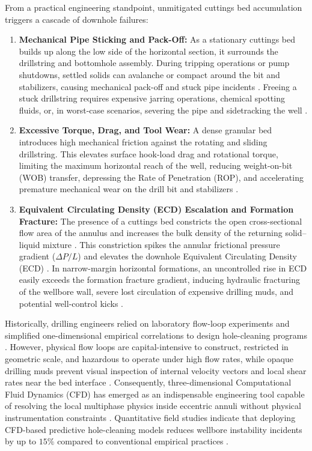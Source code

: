 From a practical engineering standpoint, unmitigated cuttings bed accumulation triggers a cascade of downhole failures:
\begin{enumerate}
    \item \textbf{Mechanical Pipe Sticking and Pack-Off:} As a stationary cuttings bed builds up along the low side of the horizontal section, it surrounds the drillstring and bottomhole assembly. During tripping operations or pump shutdowns, settled solids can avalanche or compact around the bit and stabilizers, causing mechanical pack-off and stuck pipe incidents \citep{Shehab2015, Li2026}. Freeing a stuck drillstring requires expensive jarring operations, chemical spotting fluids, or, in worst-case scenarios, severing the pipe and sidetracking the well \citep{Sorgun2010, Hajipour2020}.
    \item \textbf{Excessive Torque, Drag, and Tool Wear:} A dense granular bed introduces high mechanical friction against the rotating and sliding drillstring. This elevates surface hook-load drag and rotational torque, limiting the maximum horizontal reach of the well, reducing weight-on-bit (WOB) transfer, depressing the Rate of Penetration (ROP), and accelerating premature mechanical wear on the drill bit and stabilizers \citep{Shehab2015, Khaled2021}.
    \item \textbf{Equivalent Circulating Density (ECD) Escalation and Formation Fracture:} The presence of a cuttings bed constricts the open cross-sectional flow area of the annulus and increases the bulk density of the returning solid--liquid mixture \citep{Osgouei2010, Li2026}. This constriction spikes the annular frictional pressure gradient ($\Delta P/L$) and elevates the downhole Equivalent Circulating Density (ECD) \citep{Khalili2025, Li2026}. In narrow-margin horizontal formations, an uncontrolled rise in ECD easily exceeds the formation fracture gradient, inducing hydraulic fracturing of the wellbore wall, severe lost circulation of expensive drilling muds, and potential well-control kicks \citep{Khalili2025, Li2026}.
\end{enumerate}

Historically, drilling engineers relied on laboratory flow-loop experiments and simplified one-dimensional empirical correlations to design hole-cleaning programs \citep{Osgouei2010, Sorgun2010}. However, physical flow loops are capital-intensive to construct, restricted in geometric scale, and hazardous to operate under high flow rates, while opaque drilling muds prevent visual inspection of internal velocity vectors and local shear rates near the bed interface \citep{Hajipour2020, Li2026}. Consequently, three-dimensional Computational Fluid Dynamics (CFD) has emerged as an indispensable engineering tool capable of resolving the local multiphase physics inside eccentric annuli without physical instrumentation constraints \citep{Hajipour2020, Khalili2025}. Quantitative field studies indicate that deploying CFD-based predictive hole-cleaning models reduces wellbore instability incidents by up to $15\%$ compared to conventional empirical practices \citep{Khalili2025}.

